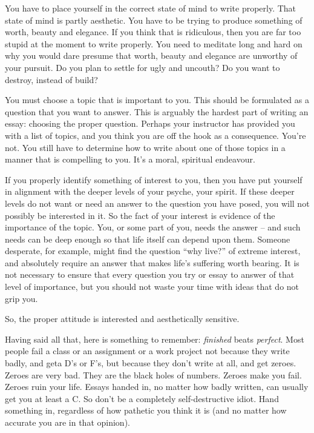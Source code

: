 \documentclass{article}
\begin{document}
You have to place yourself in the correct state of mind to write
properly. That state of mind is partly aesthetic. You have to be trying
to produce something of worth, beauty and elegance. If you think that is
ridiculous, then you are far too stupid at the moment to write properly.
You need to meditate long and hard on why you would dare presume that
worth, beauty and elegance are unworthy of your pursuit. Do you plan to
settle for ugly and uncouth? Do you want to destroy, instead of build?

You must choose a topic that is important to you. This should be
formulated as a question that you want to answer. This is arguably the
hardest part of writing an essay: choosing the proper question. Perhaps
your instructor has provided you with a list of topics, and you think
you are off the hook as a consequence. You're not. You still have to
determine how to write about one of those topics in a manner that is
compelling to you. It's a moral, spiritual endeavour.

If you properly identify something of interest to you, then you have put
yourself in alignment with the deeper levels of your psyche, your
spirit. If these deeper levels do not want or need an answer to the
question you have posed, you will not possibly be interested in it. So
the fact of your interest is evidence of the importance of the topic.
You, or some part of you, needs the answer -- and such needs can be deep
enough so that life itself can depend upon them. Someone desperate, for
example, might find the question ``why live?'' of extreme interest, and
absolutely require an answer that makes life's suffering worth bearing.
It is not necessary to ensure that every question you try or essay to
answer of that level of importance, but you should not waste your time
with ideas that do not grip you.

So, the proper attitude is interested and aesthetically sensitive.

Having said all that, here is something to remember: \emph{finished}
beats \emph{perfect}. Most people fail a class or an assignment or a
work project not because they write badly, and geta D's or F's, but
because they don't write at all, and get zeroes. Zeroes are very bad.
They are the black holes of numbers. Zeroes make you fail. Zeroes ruin
your life. Essays handed in, no matter how badly written, can usually
get you at least a C. So don't be a completely self-destructive idiot.
Hand something in, regardless of how pathetic you think it is (and no
matter how accurate you are in that opinion).
\end{document}
